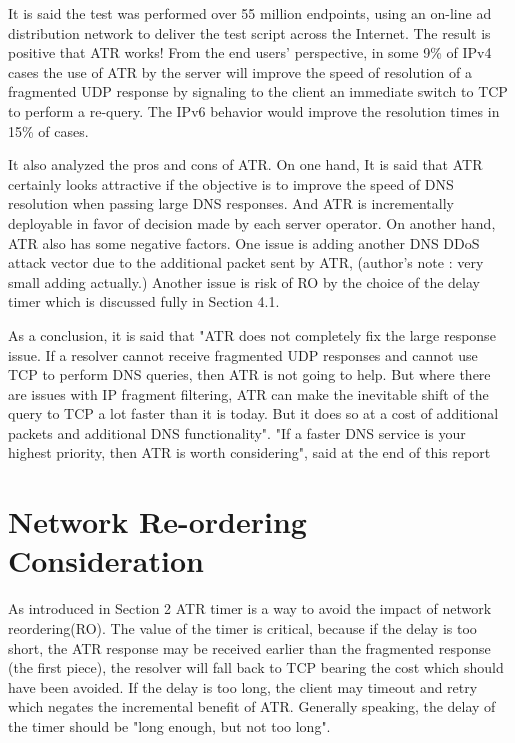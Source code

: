    It is said the test was performed over 55 million endpoints, using an
   on-line ad distribution network to deliver the test script across the
   Internet.  The result is positive that ATR works!  From the end
   users' perspective, in some 9\% of IPv4 cases the use of ATR by the
   server will improve the speed of resolution of a fragmented UDP
   response by signaling to the client an immediate switch to TCP to
   perform a re-query.  The IPv6 behavior would improve the resolution
   times in 15\% of cases.

   It also analyzed the pros and cons of ATR.  On one hand, It is said
   that ATR certainly looks attractive if the objective is to improve
   the speed of DNS resolution when passing large DNS responses.  And
   ATR is incrementally deployable in favor of decision made by each
   server operator.  On another hand, ATR also has some negative
   factors.  One issue is adding another DNS DDoS attack vector due to
   the additional packet sent by ATR, (author's note : very small adding
   actually.)  Another issue is risk of RO by the choice of the delay
   timer which is discussed fully in Section 4.1.

   As a conclusion, it is said that "ATR does not completely fix the
   large response issue.  If a resolver cannot receive fragmented UDP
   responses and cannot use TCP to perform DNS queries, then ATR is not
   going to help.  But where there are issues with IP fragment
   filtering, ATR can make the inevitable shift of the query to TCP a
   lot faster than it is today.  But it does so at a cost of additional
   packets and additional DNS functionality".  "If a faster DNS service
   is your highest priority, then ATR is worth considering", said at the
   end of this report


\section{Network Re-ordering Consideration}


As introduced in Section 2 ATR timer is a way to avoid the impact of
network reordering(RO).  The value of the timer is critical, because
if the delay is too short, the ATR response may be received earlier
than the fragmented response (the first piece), the resolver will
fall back to TCP bearing the cost which should have been avoided.  If
the delay is too long, the client may timeout and retry which negates
the incremental benefit of ATR.  Generally speaking, the delay of the
timer should be "long enough, but not too long".

